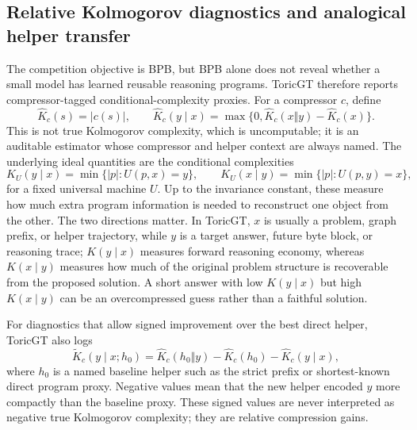 \documentclass[11pt]{article}
\theoremstyle{definition}
\theoremstyle{plain}
\theoremstyle{remark}
\numberwithin{equation}{section}
\begin{document}
\subsection{Relative Kolmogorov diagnostics and analogical helper transfer}

The competition objective is BPB, but BPB alone does not reveal whether a small model has learned reusable reasoning programs.  ToricGT therefore reports compressor-tagged conditional-complexity proxies.  For a compressor $c$, define
\begin{equation}
  \widehat K_c(s)=|c(s)|,\qquad
  \widehat K_c(y\mid x)=\max\{0,\widehat K_c(x\Vert y)-\widehat K_c(x)\}.
\end{equation}
This is not true Kolmogorov complexity, which is uncomputable; it is an auditable estimator whose compressor and helper context are always named.  The underlying ideal quantities are the conditional complexities
\begin{equation}
  K_U(y\mid x)=\min\{|p|:U(p,x)=y\},\qquad
  K_U(x\mid y)=\min\{|p|:U(p,y)=x\},
\end{equation}
for a fixed universal machine $U$.  Up to the invariance constant, these measure how much extra program information is needed to reconstruct one object from the other.  The two directions matter.  In ToricGT, $x$ is usually a problem, graph prefix, or helper trajectory, while $y$ is a target answer, future byte block, or reasoning trace; $K(y\mid x)$ measures forward reasoning economy, whereas $K(x\mid y)$ measures how much of the original problem structure is recoverable from the proposed solution.  A short answer with low $K(y\mid x)$ but high $K(x\mid y)$ can be an overcompressed guess rather than a faithful solution.

For diagnostics that allow signed improvement over the best direct helper, ToricGT also logs
\begin{equation}
  \widetilde K_c(y\mid x;h_0)=\widehat K_c(h_0\Vert y)-\widehat K_c(h_0)-\widehat K_c(y\mid x),
\end{equation}
where $h_0$ is a named baseline helper such as the strict prefix or shortest-known direct program proxy.  Negative values mean that the new helper encoded $y$ more compactly than the baseline proxy.  These signed values are never interpreted as negative true Kolmogorov complexity; they are relative compression gains.
\end{document}
